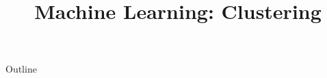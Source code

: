 \documentclass[xcolor=dvipsnames,compress,t,pdf,9pt]{beamer}
\title[\insertframenumber /\inserttotalframenumber]{Machine Learning: Clustering}
\begin{document}
	\begin{frame}
	\titlepage
	\end{frame}

	\begin{frame}{Outline}
	    \tableofcontents
	\end{frame}

	
	
	
\end{document}
